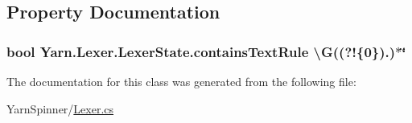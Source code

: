 \subsection{Property Documentation}
\hypertarget{a00048_a69948f05c35eeae9cb8448c849a053e6}{
\subsubsection[{contains\-Text\-Rule}]{\setlength{\rightskip}{0pt plus 5cm}bool Yarn.\-Lexer.\-Lexer\-State.\-contains\-Text\-Rule \textbackslash{}G((?!\{0\}).)$\ast$\char`\"{}\hspace{0.3cm}{\ttfamily [get]}}}\label{a00048_a69948f05c35eeae9cb8448c849a053e6}


The documentation for this class was generated from the following file\-:\begin{DoxyCompactItemize}
\item 
Yarn\-Spinner/\hyperlink{a00119}{Lexer.\-cs}\end{DoxyCompactItemize}
